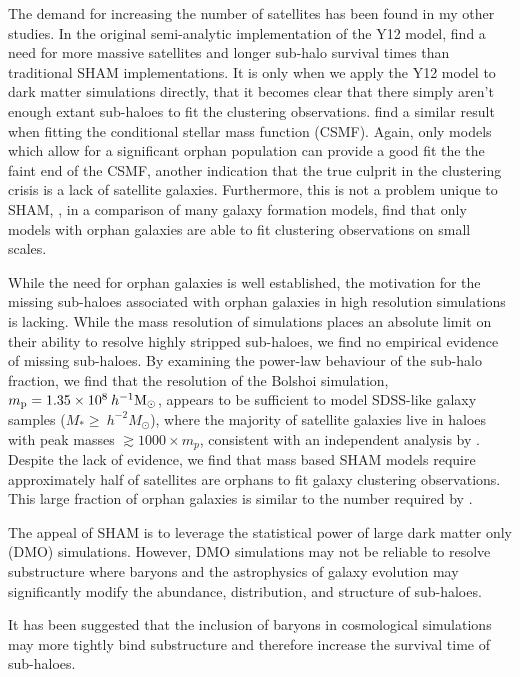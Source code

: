 \documentclass[a4paper,fleqn,usenatbib]{mnras}
\begin{document}
The demand for increasing the number of satellites has been found in my other studies.  In the original semi-analytic implementation of the Y12 model, \cite{Yang:2012ew} find a need for more massive satellites and longer sub-halo survival times than traditional SHAM implementations.  It is only when we apply the Y12 model to dark matter simulations directly, that it becomes clear that there simply aren't enough extant sub-haloes to fit the clustering observations.  \citep{Lim:2016ul} find a similar result when fitting the conditional stellar mass function (CSMF).  Again, only models which allow for a significant orphan population can provide a good fit the the faint end of the CSMF, another indication that the true culprit in the clustering crisis is a lack of satellite galaxies.  Furthermore, this is not a problem unique to SHAM, \cite{Pujol:2017ua}, in a comparison of many galaxy formation models, find that only models with orphan galaxies are able to fit clustering observations on small scales. 

While the need for orphan galaxies is well established, the motivation for the missing sub-haloes associated with orphan galaxies in high resolution simulations is lacking.  While the mass resolution of simulations places an absolute limit on their ability to resolve highly stripped sub-haloes, we find no empirical evidence of missing sub-haloes.  By examining the power-law behaviour of the sub-halo fraction, we find that the resolution of the Bolshoi simulation, $m_{\rm p} = 1.35 \times 10^8 \>h^{-1}\rm M_\odot$, appears to be sufficient to model SDSS-like galaxy samples ($M_* \geq ~h^{-2}M_{\odot}$), where the majority of satellite galaxies live in haloes with peak masses $\gtrsim 1000 \times m_p$, consistent with an independent analysis by \citep{Guo:2013fm}.  Despite the lack of evidence, we find that mass based SHAM models require approximately half of satellites are orphans to fit galaxy clustering observations.  This large fraction of orphan galaxies is similar to the number required by \cite{Yang:2012ew}.      

The appeal of SHAM is to leverage the statistical power of large dark matter only (DMO) simulations.  However, DMO simulations may not be reliable to resolve substructure where baryons and the astrophysics of galaxy evolution may significantly modify the abundance, distribution, and structure of sub-haloes.  


It has been suggested that the inclusion of baryons in cosmological simulations may more tightly bind substructure and therefore increase the survival time of sub-haloes. 
\end{document}
